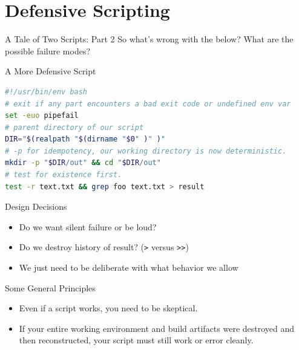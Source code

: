 \documentclass{../lecture}
\begin{document}
\section{Defensive Scripting}

\begin{frame}{A Tale of Two Scripts: Part 2}
So what's wrong with the below? What are the possible failure modes?


\end{frame}

\begin{frame}[fragile]{A More Defensive Script}
\begin{lstlisting}[language=bash]
#!/usr/bin/env bash
# exit if any part encounters a bad exit code or undefined env var
set -euo pipefail
# parent directory of our script
DIR="$(realpath "$(dirname "$0" )" )"
# -p for idempotency, our working directory is now deterministic.
mkdir -p "$DIR/out" && cd "$DIR/out"
# test for existence first.
test -r text.txt && grep foo text.txt > result
\end{lstlisting}

\begin{block}{Design Decisions}
\begin{itemize}
  \item Do we want silent failure or be loud?
  \item Do we destroy history of result? (\texttt{>} versus \texttt{>>})
  \item We just need to be deliberate with what behavior we allow
\end{itemize}
\end{block}
\end{frame}

\begin{frame}{Some General Principles}
  \begin{itemize}
    \item Even if a script works, you need to be skeptical.
    \item If your entire working environment and build artifacts were destroyed
      and then reconstructed, your script must still work or error cleanly.
  \end{itemize}
\end{frame}
\end{document}
